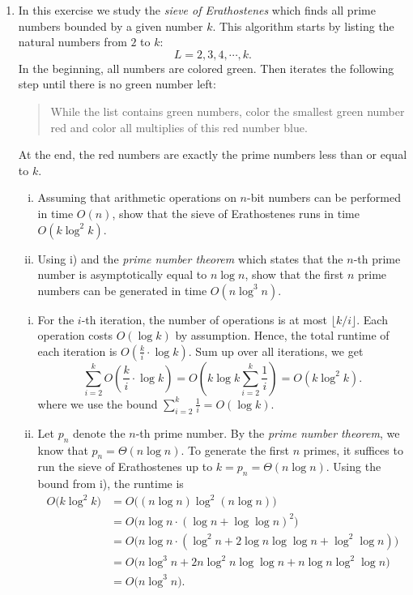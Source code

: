 \documentclass[11pt]{article}
\begin{document}
\begin{enumerate}[1)]
\item In this exercise we study the \emph{sieve of Erathostenes} which finds all prime numbers bounded by a given number $k$. This algorithm starts by listing the natural numbers from $2$ to $k$: 
  \begin{displaymath}
    L = 2,3,4, \cdots, k. 
  \end{displaymath}
  In the beginning, all numbers are colored green.
  Then iterates the following step until there is no green number left:
  \begin{quote}    
    While the list contains green numbers, color the smallest green number red and color all multiplies of this red number blue.
  \end{quote}
  At the end, the red numbers are exactly the prime numbers less than or equal to $k$.

  \begin{enumerate}[i)] 
  \item Assuming that arithmetic operations on $n$-bit numbers can be performed in time $O(n)$, show that the sieve of Erathostenes runs in time $O(k \log^2 k)$.
  \item Using i) and the \emph{prime number theorem} which states that the $n$-th prime number is asymptotically equal to $n \log n$, show that the first $n$ prime numbers can be generated in time $O(n \log^3 n)$.
  \end{enumerate}

\begin{solution}
\begin{enumerate}[i)] 
\item  For the $i$-th iteration, the number of operations is at most $\lfloor k/i \rfloor$. Each operation costs $O(\log k)$ by assumption.
Hence, the total runtime of each iteration is $O\!\left(\frac{k}{i} \cdot \log k\right)$.
Sum up over all iterations, we get
\[\sum_{i=2}^k O\!\left(\frac{k}{i} \cdot \log k\right) = O\!\left(k \log k \sum_{i=2}^k \frac{1}{i}\right) = O(k \log^2 k).\]
where we use the bound $\sum_{i=2}^k \frac{1}{i} = O(\log k)$.

\item  
Let $p_n$ denote the $n$-th prime number. By the \emph{prime number theorem}, we know that $p_n = \Theta(n \log n)$.
To generate the first $n$ primes, it suffices to run the sieve of Erathostenes up to $k = p_n = \Theta(n \log n)$.
Using the bound from i), the runtime is
\begin{align*}
O\bigl(k \log^2 k\bigr) 
&= O\bigl((n \log n) \log^2 (n \log n)\bigr) \\
&= O\bigl(n \log n \cdot (\log n + \log \log n)^2\bigr) \\
&= O\bigl(n \log n \cdot (\log^2 n + 2 \log n \log \log n + \log^2 \log n)\bigr) \\
&= O\bigl(n \log^3 n + 2 n \log^2 n \log \log n + n \log n \log^2 \log n\bigr) \\
&= O\bigl(n \log^3 n\bigr).
\end{align*}
\end{enumerate}
\end{solution}
  

\end{enumerate}
\end{document}
